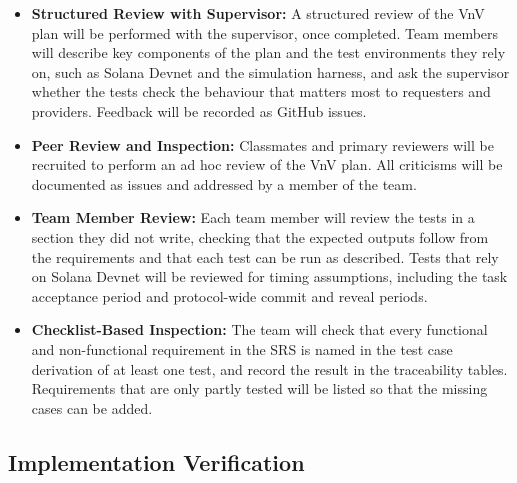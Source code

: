 \documentclass[12pt]{article}
\begin{document}
\begin{itemize}
  \item \textbf{Structured Review with Supervisor: } 
  A structured review of the VnV plan will be performed with the supervisor, once completed. Team members will
  describe key components of the plan and the test environments they rely on, such as Solana Devnet and the
  simulation harness, and ask the supervisor whether the tests check the behaviour that matters most to
  requesters and providers. Feedback will be recorded as GitHub issues.
  \item \textbf{Peer Review and Inspection: }
  Classmates and primary reviewers will be recruited to perform an ad hoc review of the VnV plan. All
  criticisms will be documented as issues and addressed by a member of the team.
  \item \textbf{Team Member Review: }
  Each team member will review the tests in a section they did not write, checking that the expected outputs
  follow from the requirements and that each test can be run as described. Tests that rely on Solana Devnet
  will be reviewed for timing assumptions, including the task acceptance period and protocol-wide commit and reveal periods.
  \item \textbf{Checklist-Based Inspection: } 
  The team will check that every functional and non-functional requirement in the SRS is named in the test
  case derivation of at least one test, and record the result in the traceability tables. Requirements that
  are only partly tested will be listed so that the missing cases can be added.
\end{itemize}

\subsection{Implementation Verification}



\end{document}
